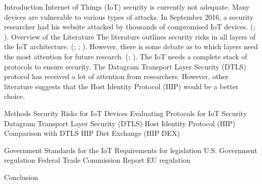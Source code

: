 \documentclass{article}
\begin{document}
\begin{outline}[enumerate]
\1 Introduction
	\2 Internet of Things (IoT) security is currently not adequate.
		\3 Many devices are vulnerable to various types of attacks.
		\3 In September 2016, a security researcher had his website attacked by thousands of compromised IoT devices. (\cite{Krebs}; \cite{Incapsula}).
	\2 Overview of the Literature
		\3 The literature outlines security risks in all layers of the IoT architecture. (\cite{Xiaohui6643029}; \cite{Zhao6746513}; \cite{Suo6188257}).
			\4 However, there is some debate as to which layers need the most attention for future research. (\cite{Zhao6746513}; \cite{Kozlov}).
		\3 The IoT needs a complete stack of protocols to ensure security. 
			\4 The Datagram Transport Layer Security (DTLS) protocol has received a lot of attention from researchers. 
			\4 However, other literature suggests that the Host Identity Protocol (HIP) would be a better choice. 
			
\1 Methods
\1 Security Risks for IoT Devices
\1 Evaluating Protocols for IoT Security
	\2 Datagram Transport Layer Security (DTLS)
	\2 Host Identity Protocol (HIP)
		\3 Comparison with DTLS
		\3 HIP Diet Exchange (HIP DEX)

\1 Government Standards for the IoT  
	\2 Requirements for legislation
	\2 U.S. Government regulation
		\3 Federal Trade Commission Report
	\2 EU regulation

\1 Conclusion
\end{outline}
\end{document}

